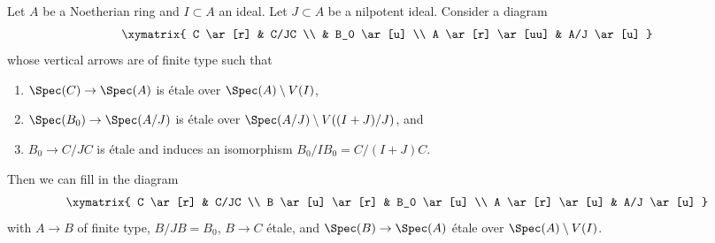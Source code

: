 \begin{lemma}
\label{lemma-lift-approximation}
Let $A$ be a Noetherian ring and $I \subset A$ an ideal.
Let $J \subset A$ be a nilpotent ideal. Consider a diagram
$$
\xymatrix{
C \ar[r] & C/JC \\
& B_0 \ar[u] \\
A \ar[r] \ar[uu] & A/J \ar[u]
}
$$
whose vertical arrows are of finite type such that
\begin{enumerate}
\item $\Spec(C) \to \Spec(A)$ is \'etale over $\Spec(A) \setminus V(I)$,
\item $\Spec(B_0) \to \Spec(A/J)$ is \'etale over
$\Spec(A/J) \setminus V((I + J)/J)$, and
\item $B_0 \to C/JC$ is \'etale and induces an isomorphism
$B_0/IB_0 = C/(I + J)C$.
\end{enumerate}
Then we can fill in the diagram
$$
\xymatrix{
C \ar[r] & C/JC \\
B \ar[u] \ar[r] & B_0 \ar[u] \\
A \ar[r] \ar[u] & A/J \ar[u]
}
$$
with $A \to B$ of finite type, $B/JB = B_0$, $B \to C$ \'etale, and
$\Spec(B) \to \Spec(A)$ \'etale over $\Spec(A) \setminus V(I)$.
\end{lemma}

